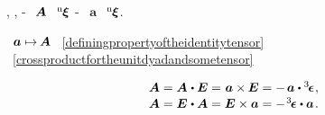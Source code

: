 %
,
,
\hbox{\hspace{-0.2ex}\inquotes{${\dotp\hspace{.22ex}}$}\hspace{-0.2ex}-}
~${\hspace{-0.2ex}\bm{A}}$
~${\hspace{-0.2ex}{^\mathrm{n}\hspace{-0.12ex}\bm{\xi}}}$
\hbox{\hspace{-0.2ex}\inquotes{${\hspace{-0.25ex}\times\hspace{-0.1ex}}$}\hspace{-0.2ex}-}
~$\bm{a}$
~${\hspace{-0.2ex}{^\mathrm{n}\hspace{-0.12ex}\bm{\xi}}}$.

~${\bm{a} \mapsto \hspace{-0.2ex} \bm{A}}$
~\eqref{definingpropertyoftheidentitytensor}
~\eqref{crossproductfortheunitdyadandsometensor}

\nopagebreak\vspace{-0.1em}
\begin{equation}\label{skewsymmetricbivalentfromvector}
\begin{array}{c}
\bm{A} = \bm{A} \hspace{.1ex} \dotp \UnitDyad = \hspace{.1ex} \bm{a} \times \hspace{-0.1ex} \UnitDyad = - \hspace{.3ex} \bm{a} \dotp \permutationsparitytensor
\hspace{.1ex} ,
\\[.1em]
\bm{A} = \UnitDyad \hspace{.1ex} \dotp \bm{A} = \UnitDyad \times \bm{a} = - \hspace{.2ex} \permutationsparitytensor \dotp \bm{a}
\hspace{.2ex} .
\end{array}
\end{equation}

